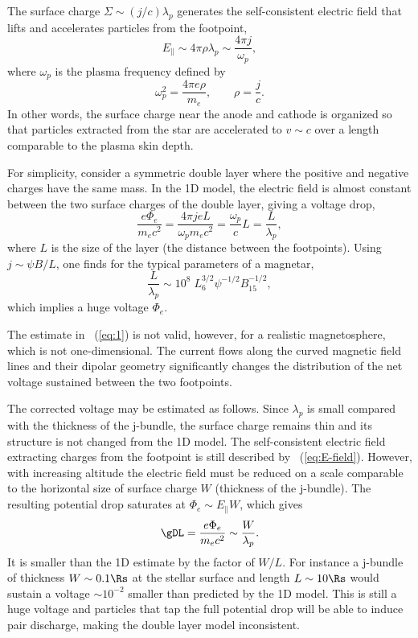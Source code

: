 The surface charge $\Sigma\sim (j/c)\lambda_p$ generates the self-consistent
electric field that lifts and accelerates particles from the footpoint,
\begin{equation}
  \label{eq:E-field}
  E_\parallel\sim 4\pi\rho\lambda_p \sim \frac{4\pi j}{\omega_p},
\end{equation}
where
$\omega_p$ is the plasma frequency defined by
\begin{equation}
\label{eq:omega_p}
  \omega_p^2=\frac{4\pi e\rho}{m_e}, \qquad \rho=\frac{j}{c}.
\end{equation}
In other words, the surface charge near the anode and cathode is organized
so that particles extracted from the star are accelerated to $v\sim c$ over a
length comparable to the plasma skin depth.

For simplicity, consider a symmetric double layer where the positive and
negative charges have the same mass. In the 1D model, the electric field is
almost constant between the two surface charges of the double layer, giving a voltage drop,
\begin{equation}
  \label{eq:1}
  \frac{e\Phi_{e}}{m_{e}c^2} = \frac{4\pi j e L}{\omega_pm_{e}c^{2}} = \frac{\omega_p}{c}L = \frac{L}{\lambda_p},
\end{equation}
where $L$ is the size of the layer (the distance between the footpoints).
Using $j\sim \psi B/L$, one finds for the typical parameters of a magnetar,
\begin{equation}
  \label{eq:1D}
   \frac{L}{\lambda_p} \sim 10^{8}\; L_6^{3/2}\psi^{-1/2} B_{15}^{-1/2},
\end{equation}
which
implies a huge voltage $\Phi_e$.

The estimate in \Eq~(\ref{eq:1}) is not
valid, however, for a realistic
magnetosphere, which is not one-dimensional.
The current flows along the curved magnetic field lines and their dipolar geometry
significantly changes the distribution of
the net voltage
sustained between the two footpoints.

The corrected voltage may be estimated as follows.
Since $\lambda_p$ is small compared with the thickness of the j-bundle,
the surface charge remains thin and its structure is not changed from the 1D model.
The self-consistent electric field extracting charges from the footpoint is still described by
\Eq~(\ref{eq:E-field}). However, with increasing altitude the electric field
must be reduced on a scale comparable to the horizontal size of surface charge
$W$ (thickness of the j-bundle). The resulting potential drop saturates at
$\Phi_e\sim E_\parallel W$, which gives
\begin{equation}
  \label{eq:voltage}
  \gDL=\frac{e\Phi_{e}}{m_{e}c^2}
  \sim \frac{W}{\lambda_p}.
\end{equation}
It is smaller than the 1D estimate by the factor of $W/L$. For instance a
j-bundle of thickness $W\sim 0.1\Rs$ at the stellar surface and length $L\sim 10
\Rs$ would sustain a voltage $\sim 10^{-2}$ smaller than predicted by the 1D
model. This is still a huge voltage and particles that tap the full potential
drop will be able to induce pair discharge, making the double layer model
inconsistent.

